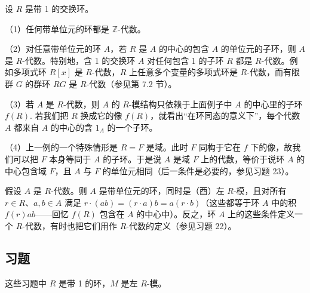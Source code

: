 \begin{example}
设 \(R\) 是带 1 的交换环。

（1）任何带单位元的环都是 \(\mathbb{Z}\)-代数。

（2）对任意带单位元的环 \(A\)，若 \(R\) 是 \(A\) 的中心的包含 \(A\) 的单位元的子环，则 \(A\) 是 \(R\)-代数。特别地，含 1 的交换环 \(A\) 对任何包含 1 的子环 \(R\) 都是 \(R\)-代数。例如多项式环 \(R[x]\) 是 \(R\)-代数，\(R\) 上任意多个变量的多项式环是 \(R\)-代数，而有限群 \(G\) 的群环 \(RG\) 是 \(R\)-代数（参见第 7.2 节）。

（3）若 \(A\) 是 \(R\)-代数，则 \(A\) 的 \(R\)-模结构只依赖于上面例子中 \(A\) 的中心里的子环 \(f(R)\). 若我们把 \(R\) 换成它的像 \(f(R)\)，就看出“在环同态的意义下”，每个代数 \(A\) 都来自 \(A\) 的中心的含 \(1_A\) 的一个子环。

（4）上一例的一个特殊情形是 \(R = F\) 是域。此时 \(F\) 同构于它在 \(f\) 下的像，故我们可以把 \(F\) 本身等同于 \(A\) 的子环。于是说 \(A\) 是域 \(F\) 上的代数，等价于说环 \(A\) 的中心包含域 \(F\)，且 \(A\) 与 \(F\) 的单位元相同（后一条件是必要的，参见习题 23）。
\end{example}

假设 \(A\) 是 \(R\)-代数。则 \(A\) 是带单位元的环，同时是（酉）左 \(R\)-模，且对所有 \(r \in R\)、\(a, b \in A\) 满足 \(r \cdot (ab) = (r \cdot a)b = a(r \cdot b)\)（这些都等于环 \(A\) 中的积 \(f(r)ab\)——回忆 \(f(R)\) 包含在 \(A\) 的中心中）。反之，环 \(A\) 上的这些条件定义一个 \(R\)-代数，有时也把它们用作 \(R\)-代数的定义（参见习题 22）。

\subsection*{习题}

\noindent 这些习题中 \(R\) 是带 1 的环，\(M\) 是左 \(R\)-模。

